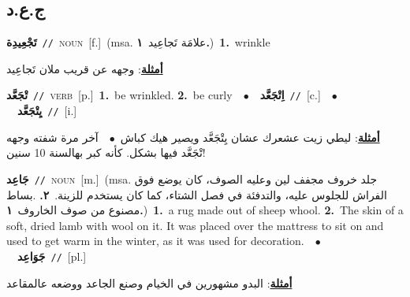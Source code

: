\documentclass[10pt,a4paper,twoside]{article} %
\begin{document}
\begin{multicols}{2}
\vspace{-3mm}
\subsection*{\color{blue}\foreignlanguage{arabic}{ج.ع.د}\color{blue}{}} 

{\setlength\topsep{0pt}\textbf{\foreignlanguage{arabic}{تَجْعِيدِة}}\ {\color{gray}\texttt{//}\color{black}}\ \textsc{noun}\ [f.]\ \color{gray}(msa. \foreignlanguage{arabic}{علامَة تَجاعِيد}~\foreignlanguage{arabic}{\textbf{١.}})\color{black}\ \textbf{1.}~wrinkle\  \begin{flushright}\color{gray}\foreignlanguage{arabic}{\textbf{\underline{\foreignlanguage{arabic}{أمثلة}}}: وجهه عن قريب ملان تَجاعِيد}\end{flushright}\color{black}} \vspace{2mm}

{\setlength\topsep{0pt}\textbf{\foreignlanguage{arabic}{تْجَعَّد}}\ {\color{gray}\texttt{//}\color{black}}\ \textsc{verb}\ [p.]\ \textbf{1.}~be wrinkled.  \textbf{2.}~be curly\ \ $\bullet$\ \ \setlength\topsep{0pt}\textbf{\foreignlanguage{arabic}{اِتْجَعَّد}}\ {\color{gray}\texttt{//}\color{black}}\ [c.]\ \ $\bullet$\ \ \setlength\topsep{0pt}\textbf{\foreignlanguage{arabic}{يِتْجَعَّد}}\ {\color{gray}\texttt{//}\color{black}}\ [i.]\  \begin{flushright}\color{gray}\foreignlanguage{arabic}{\textbf{\underline{\foreignlanguage{arabic}{أمثلة}}}: ليطي زيت عشعرك عشان يِتْجَعَّد ويصير هيك كباش\ $\bullet$\ \  آخر مرة شفته وجهه تْجَعَّد فيها بشكل. كأنه كبر بهالسنة 10 سنين!}\end{flushright}\color{black}} \vspace{2mm}

{\setlength\topsep{0pt}\textbf{\foreignlanguage{arabic}{جَاعِد}}\ {\color{gray}\texttt{//}\color{black}}\ \textsc{noun}\ [m.]\ \color{gray}(msa. \foreignlanguage{arabic}{جلد خروف مجفف لين وعليه الصوف، كان يوضع فوق الفراش للجلوس عليه، والتدفئة في فصل الشتاء، كما كان يستخدم للزينة.}~\foreignlanguage{arabic}{\textbf{٢.}}  .\foreignlanguage{arabic}{بساط مصنوع من صوف الخاروف}~\foreignlanguage{arabic}{\textbf{١.}})\color{black}\ \textbf{1.}~a rug made out of sheep whool.  \textbf{2.}~The skin of a soft, dried lamb with wool on it. It was placed over the mattress to sit on and used to get warm in the winter, as it was used for decoration.\ \ $\bullet$\ \ \setlength\topsep{0pt}\textbf{\foreignlanguage{arabic}{جَوَاعِد}}\ {\color{gray}\texttt{//}\color{black}}\ [pl.]\  \begin{flushright}\color{gray}\foreignlanguage{arabic}{\textbf{\underline{\foreignlanguage{arabic}{أمثلة}}}: البدو مشهورين في الخيام وصنع الجاعد ووضعه عالمقاعد}\end{flushright}\color{black}} \vspace{2mm}


\end{multicols}
\end{document}

